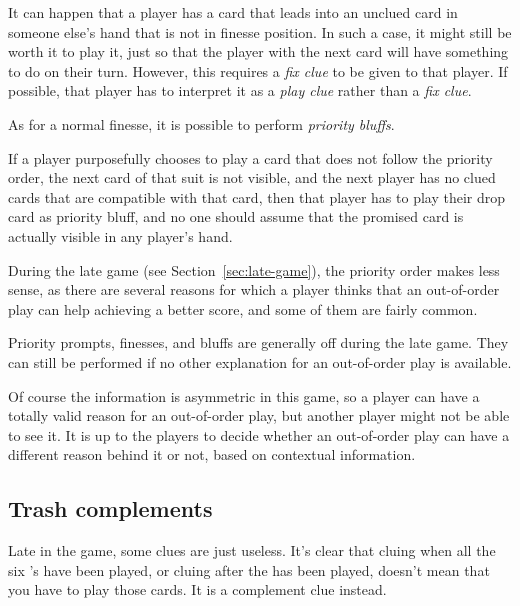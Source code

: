 It can happen that a player has a card that leads into an unclued card in someone else's hand that is not in finesse position. In such a case, it might still be worth it to play it, just so that the player with the next card will have something to do on their turn. However, this requires a \emph{fix clue} to be given to that player. If possible, that player has to interpret it as a \emph{play clue} rather than a \emph{fix clue}.


As for a normal finesse, it is possible to perform \emph{priority bluffs}.

\begin{convention}
	If a player purposefully chooses to play a card that does not follow the priority order, the next card of that suit is not visible, and the next player has no clued cards that are compatible with that card, then that player has to play their drop card as priority bluff, and no one should assume that the promised card is actually visible in any player's hand.
\end{convention}

During the late game (see Section~\ref{sec:late-game}), the priority order makes less sense, as there are several reasons for which a player thinks that an out-of-order play can help achieving a better score, and some of them are fairly common.

\begin{convention}
	Priority prompts, finesses, and bluffs are generally off during the late game. They can still be performed if no other explanation for an out-of-order play is available.
\end{convention}

Of course the information is asymmetric in this game, so a player can have a totally valid reason for an out-of-order play, but another player might not be able to see it. It is up to the players to decide whether an out-of-order play can have a different reason behind it or not, based on contextual information.

\subsection{Trash complements}

Late in the game, some clues are just useless. It's clear that cluing  when all the six 's have been played, or cluing  after the  has been played, doesn't mean that you have to play those cards. It is a complement clue instead.

